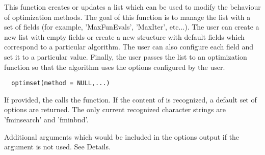 %
\begin{Description}\relax
This function creates or updates a list which can be used to modify
the behaviour of optimization methods. The goal of this function is to manage
the  list with a set of fields (for example, 'MaxFunEvals',
'MaxIter', etc...). The user can create a new list with empty fields or
create a new structure with default fields which correspond to a particular
algorithm. The user can also configure each field and set it to a particular
value. Finally, the user passes the list to an optimization function so
that the algorithm uses the options configured by the user.
\end{Description}
%
\begin{Usage}
\begin{verbatim}
  optimset(method = NULL,...)
\end{verbatim}
\end{Usage}
%
\begin{Arguments}
\begin{ldescription}
\item[\code{method}] If provided, the  calls the  
function. If the content of  is recognized, a default set of 
options are returned. The only current recognized character strings are 
'fminsearch' and 'fminbnd'.
\item[\code{...}] Additional arguments which would be included in the options output
if the  argument is not used. See Details.
\end{ldescription}
\end{Arguments}
%
